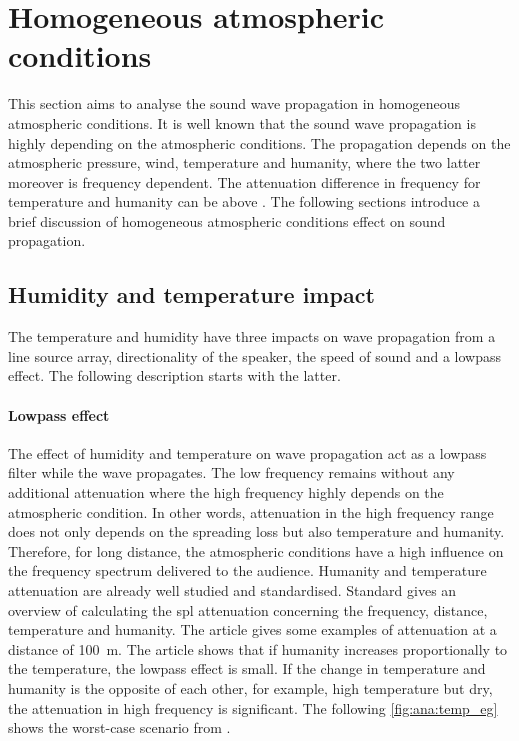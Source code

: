 \section{Homogeneous atmospheric conditions}\label{sec:ana:hom_ats_con}
This section aims to analyse the sound wave propagation in homogeneous atmospheric conditions. It is well known that the sound wave propagation is highly depending on the atmospheric conditions. The propagation depends on the atmospheric pressure, wind, temperature and humanity, where the two latter moreover is frequency dependent. The attenuation difference in frequency for temperature and humanity can be above  \citep{corteel2017large}. The following sections introduce a brief discussion of homogeneous atmospheric conditions effect on sound propagation.


\subsection{Humidity and temperature impact}\label{sec:ana:hu_temp}
The temperature and humidity have three impacts on wave propagation from a line source array, directionality of the speaker, the speed of sound and a lowpass effect. The following description starts with the latter. 

\paragraph{Lowpass effect} The effect of humidity and temperature on wave propagation act as a lowpass filter while the wave propagates. The low frequency remains without any additional attenuation where the high frequency highly depends on the atmospheric condition. In other words, attenuation in the high frequency range does not only depends on the spreading loss but also temperature and humanity. Therefore, for long distance, the atmospheric conditions have a high influence on the frequency spectrum delivered to the audience. Humanity and temperature attenuation are already well studied and standardised. Standard \citep{iso_9613-1} gives an overview of calculating the \gls{spl}  attenuation concerning the frequency, distance, temperature and humanity. The article \citep{corteel2017large} gives some examples of attenuation at a distance of \SI{100}{\meter}. The article shows that if humanity increases proportionally to the temperature, the lowpass effect is small. If the change in temperature and humanity is the opposite of each other, for example, high temperature but dry, the attenuation in high frequency is significant. The following \autoref{fig:ana:temp_eg} shows the worst-case scenario from \citep{corteel2017large}.

